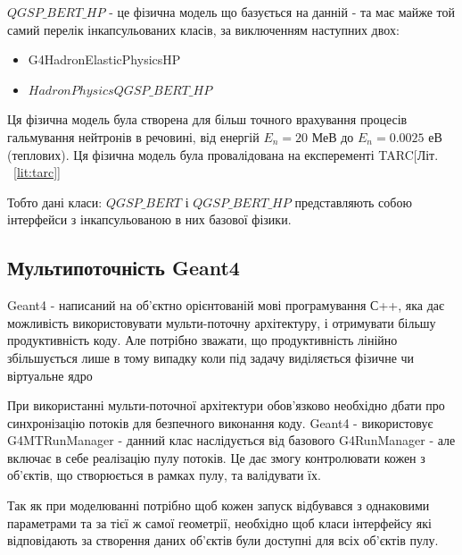 \documentclass[a4paper, 14pt]{article}
\numberwithin{equation}{section}
\numberwithin{table}{section}
\begin{document}
$QGSP\_BERT\_HP$ - це фізична модель що базується на данній - та має майже той самий перелік інкапсульованих класів, за виключенням наступних двох:
\begin{itemize}
	\item G4HadronElasticPhysicsHP
	\item $HadronPhysicsQGSP\_BERT\_HP$
\end{itemize}
Ця фізична модель була створена для більш точного врахування процесів гальмування нейтронів в речовині, від енергій $E_n = 20$ МеВ до $E_n = 0.0025$ еВ (теплових). Ця фізична модель була провалідована на експеременті TARC[Літ. ~\ref{lit:tarc}]

Тобто дані класи: $QGSP\_BERT$ і $QGSP\_BERT\_HP$ представляють собою інтерфейси з інкапсульованою в них базової фізики.
	
\subsection{Мультипоточність Geant4}
Geant4 - написаний на об'єктно орієнтованій мові програмування С++, яка дає можливість використовувати мульти-поточну архітектуру, і отримувати більшу продуктивність коду. Але потрібно зважати, що продуктивність лінійно збільшується лише в тому випадку коли під задачу виділяється фізичне чи віртуальне ядро 
	
При використанні мульти-поточної архітектури обов'язково необхідно дбати про синхронізацію потоків для безпечного виконання коду. Geant4 - використовує G4MTRunManager - данний клас наслідується від базового G4RunManager - але включає в себе реалізацію пулу потоків. Це дає змогу контролювати кожен з об'єктів, що створюється в рамках пулу, та валідувати їх. 

Так як при моделюванні потрібно щоб кожен запуск відбувався з однаковими параметрами та за тієї ж самої геометрії, необхідно щоб класи інтерфейсу які відповідають за створення даних об'єктів були доступні для всіх об'єктів пулу.
	
\end{document}
